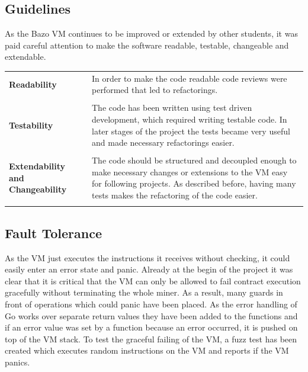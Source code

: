 \subsection{Guidelines}
As the Bazo VM continues to be improved or extended by other students, it was paid careful attention to make the software readable, testable, changeable and extendable. 

\begin{tabular}[t]{ p{3cm} p{12.5cm}}
\raggedright
\textbf{Readability} &
In order to make the code readable code reviews were performed that led to refactorings. \\ \\

\raggedright
\textbf{Testability} &
The code has been written using test driven development, which required writing testable code. In later stages of the project the tests became very useful and made necessary refactorings easier. \\ \\
 
\raggedright
\textbf{Extendability and Changeability} &
The code should be structured and decoupled enough to make necessary changes or extensions to the VM easy for following projects. As described before, having many tests makes the refactoring of the code easier. \\ \\ 
\end{tabular}

\subsection{Fault Tolerance}
As the VM just executes the instructions it receives without checking, it could easily enter an error state and panic. Already at the begin of the project it was clear that it is critical that the VM can only be allowed to fail contract execution gracefully without terminating the whole miner. As a result, many guards in front of operations which could panic have been placed. As the error handling of Go works over separate return values they have been added to the functions and if an error value was set by a function because an error occurred, it is pushed on top of the VM stack. To test the graceful failing of the VM, a fuzz test has been created which executes random instructions on the VM and reports if the VM panics. 

